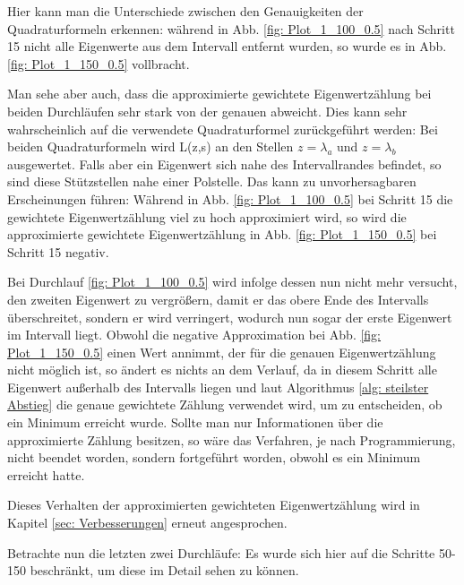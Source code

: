 \documentclass[a4paper,12pt]{report}
\newcommand{\1}{\mathds{1}}
\theoremstyle{plain} %
\theoremstyle{definition} %
\theoremstyle{remark}
\begin{document}
            Hier kann man die Unterschiede zwischen den Genauigkeiten der Quadraturformeln erkennen: während in Abb. \ref{fig: Plot_1_100_0.5} nach Schritt 15 nicht alle Eigenwerte aus dem Intervall entfernt wurden,
            so wurde es in Abb. \ref{fig: Plot_1_150_0.5} vollbracht.

            Man sehe aber auch, dass die approximierte gewichtete Eigenwertzählung bei beiden Durchläufen sehr stark von der genauen abweicht.
            Dies kann sehr wahrscheinlich auf die verwendete Quadraturformel zurückgeführt werden:
            Bei beiden Quadraturformeln wird L(z,s) an den Stellen $z=\lambda_a$ und $z=\lambda_b$ ausgewertet.
            Falls aber ein Eigenwert sich nahe des Intervallrandes befindet, so sind diese Stützstellen nahe einer Polstelle.
            Das kann zu unvorhersagbaren Erscheinungen führen:
            Während in Abb. \ref{fig: Plot_1_100_0.5} bei Schritt 15 die gewichtete Eigenwertzählung viel zu hoch approximiert wird,
            so wird die approximierte gewichtete Eigenwertzählung in Abb. \ref{fig: Plot_1_150_0.5} bei Schritt 15 negativ.

            Bei Durchlauf \ref{fig: Plot_1_100_0.5} wird infolge dessen nun nicht mehr versucht, den zweiten Eigenwert zu vergrößern, damit er das obere Ende des Intervalls überschreitet, sondern er wird verringert, wodurch nun sogar der erste Eigenwert im Intervall liegt.
            Obwohl die negative Approximation bei Abb. \ref{fig: Plot_1_150_0.5} einen Wert annimmt, der für die genauen Eigenwertzählung nicht möglich ist, so ändert es nichts an dem Verlauf, da in diesem Schritt alle Eigenwert außerhalb des Intervalls liegen und laut Algorithmus \ref{alg: steilster Abstieg} die genaue gewichtete Zählung verwendet wird, um zu entscheiden, ob ein Minimum erreicht wurde.
            Sollte man nur Informationen über die approximierte Zählung besitzen, so wäre das Verfahren, je nach Programmierung, nicht beendet worden, sondern fortgeführt worden, obwohl es ein Minimum erreicht hatte.

            Dieses Verhalten der approximierten gewichteten Eigenwertzählung wird in Kapitel \ref{sec: Verbesserungen} erneut angesprochen.

            Betrachte nun die letzten zwei Durchläufe:
            Es wurde sich hier auf die Schritte 50-150 beschränkt, um diese im Detail sehen zu können.
\end{document}
